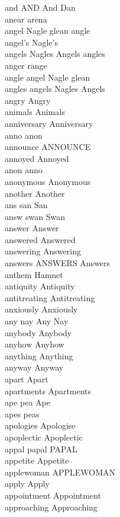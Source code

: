 and AND And Dan\\
anear arena\\
angel Nagle glean angle\\
angel's Nagle's\\
angels Nagles Angels angles\\
anger range\\
angle angel Nagle glean\\
angles angels Nagles Angels\\
angry Angry\\
animals Animals\\
anniversary Anniversary\\
anno anon\\
announce ANNOUNCE\\
annoyed Annoyed\\
anon anno\\
anonymous Anonymous\\
another Another\\
ans san San\\
answ swan Swan\\
answer Answer\\
answered Answered\\
answering Answering\\
answers ANSWERS Answers\\
anthem Hamnet\\
antiquity Antiquity\\
antitreating Antitreating\\
anxiously Anxiously\\
any nay Any Nay\\
anybody Anybody\\
anyhow Anyhow\\
anything Anything\\
anyway Anyway\\
apart Apart\\
apartments Apartments\\
ape pea Ape\\
apes peas\\
apologies Apologise\\
apoplectic Apoplectic\\
appal papal PAPAL\\
appetite Appetite\\
applewoman APPLEWOMAN\\
apply Apply\\
appointment Appointment\\
approaching Approaching\\
